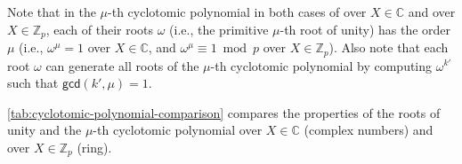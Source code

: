 Note that in the $\mu$-th cyclotomic polynomial in both cases of over $X \in \mathbb{C}$ and over $X \in \mathbb{Z}_p$, each of their roots $\omega$ (i.e., the primitive $\mu$-th root of unity) has the order $\mu$ (i.e., $\omega^{\mu} = 1$ over $X \in \mathbb{C}$, and $\omega^{\mu} \equiv 1 \bmod p$ over $X \in \mathbb{Z}_p$). Also note that each root $\omega$ can generate all roots of the $\mu$-th cyclotomic polynomial by computing $\omega^{k'}$ such that $\textsf{gcd}(k', \mu) = 1$.

\autoref{tab:cyclotomic-polynomial-comparison} compares the properties of the roots of unity and the $\mu$-th cyclotomic polynomial over $X \in \mathbb{C}$ (complex numbers) and over $X \in \mathbb{Z}_p$ (ring).






